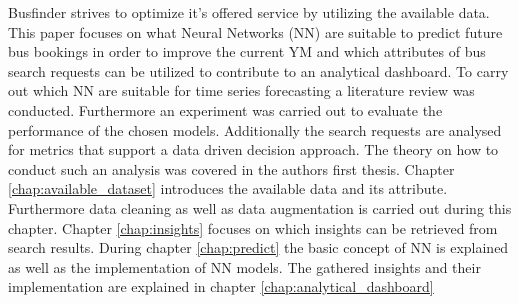 \newline
\newline
Busfinder strives to optimize it's offered service by utilizing the available data. This paper focuses on what Neural Networks (NN) are suitable to predict future bus bookings in order to improve the current YM and which attributes of bus search requests can be utilized to contribute to an analytical dashboard. To carry out which NN are suitable for time series forecasting a literature review was conducted. Furthermore an experiment was carried out to evaluate the performance of the chosen models. Additionally the search requests are analysed for metrics that support a data driven  decision approach. The theory on how to conduct such an analysis was covered in the authors first thesis. Chapter \ref{chap:available_dataset} introduces the available data and its attribute. Furthermore data cleaning as well as data augmentation is carried out during this chapter. Chapter \ref{chap:insights} focuses on which insights can be retrieved from search results. During chapter \ref{chap:predict} the basic concept of NN is explained as well as the implementation of NN models. The gathered insights and their implementation are explained in chapter \ref{chap:analytical_dashboard}


